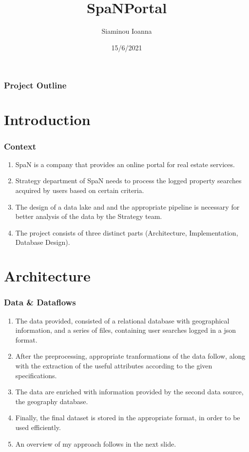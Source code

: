 \documentclass{beamer}
\title[Data Engineering assignment]{SpaNPortal}
\author{Siaminou Ioanna}
\date{15/6/2021}
\begin{document}
\frame{\titlepage}


\begin{frame}
\frametitle{Project Outline}
\tableofcontents
\end{frame}

\section{Introduction}
\begin{frame}
\frametitle{Context}
\begin{enumerate}
\item SpaN is a company that provides an online portal for real estate services.
\item Strategy department of SpaN needs to process the logged property searches acquired by users based on certain criteria.
\item The design of a data lake and and the appropriate pipeline is necessary for better analysis of the data by the Strategy team.
\item The project consists of three distinct parts (Architecture, Implementation, Database Design).
\end{enumerate}
\end{frame}

\section{Architecture}
\begin{frame}
\frametitle{Data \& Dataflows}
\begin{enumerate}
\item The data provided, consisted of a relational database with geographical information, and a series of files, containing user searches logged in a json format.
\item After the preprocessing, appropriate tranformations of the data follow, along with the extraction of the useful attributes according to the given specifications.
\item The data are enriched with information provided by the second data source, the geography database.
\item Finally, the final dataset is stored in the appropriate format, in order to be used efficiently.
\item An overview of my approach follows in the next slide.
\end{enumerate}
\end{frame}
\end{document}

